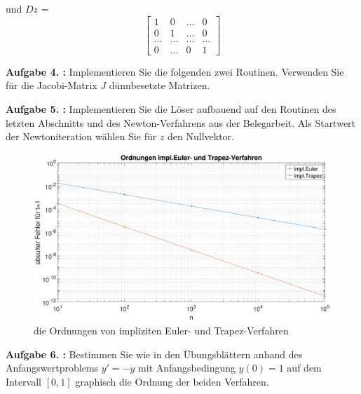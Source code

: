 und $Dz$ =
\begin{equation}
\begin{bmatrix}
	1 & 0 & ... & 0 \\
	0 & 1 & ... & 0 \\
	... & ... & ... & ... \\
	0 & ... & 0 & 1 
\end{bmatrix}  
\end{equation}

\begin{mybox}
	\textbf{Aufgabe 4. :}
	Implementieren Sie die folgenden zwei Routinen. Verwenden Sie für die Jacobi-Matrix $J$ dünnbesetzte
	Matrizen.
\end{mybox}

\begin{figure}[htb]
	
\end{figure}
\begin{figure}[htb]
	
\end{figure}

\begin{mybox}
	\textbf{Aufgabe 5. :}
	Implementieren Sie die Löser aufbauend auf den Routinen des letzten Abschnitts und des Newton-Verfahrens aus der Belegarbeit. Als Startwert der Newtoniteration wählen Sie für $z$ den Nullvektor.
\end{mybox}

\begin{figure}[h]
	\centering
	\includegraphics[width=1\textwidth]{figures/Impl._3_1_6/Ordnungen_E_T}
	\caption{die Ordnungen von impliziten Euler- und Trapez-Verfahren}
\end{figure}


\clearpage

\begin{mybox}
	\textbf{Aufgabe 6. :}
	Bestimmen Sie wie in den Übungsblättern anhand des Anfangswertproblems $ y' = -y $ mit Anfangsbedingung $ y(0) = 1 $ auf dem Intervall $ [0,1] $ graphisch die Ordnung der beiden Verfahren.
\end{mybox}

